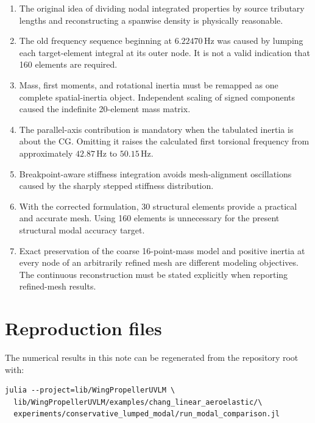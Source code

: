 \documentclass[11pt,a4paper]{article}
\newcommand{\Hz}{\,\mathrm{Hz}}
\begin{document}
\begin{enumerate}
  \item The original idea of dividing nodal integrated properties by source
        tributary lengths and reconstructing a spanwise density is physically
        reasonable.
  \item The old frequency sequence beginning at \(6.22470\Hz\) was caused by
        lumping each target-element integral at its outer node.  It is not a
        valid indication that 160 elements are required.
  \item Mass, first moments, and rotational inertia must be remapped as one
        complete spatial-inertia object.  Independent scaling of signed
        components caused the indefinite 20-element mass matrix.
  \item The parallel-axis contribution is mandatory when the tabulated
        inertia is about the CG.  Omitting it raises the calculated first
        torsional frequency from approximately \(42.87\Hz\) to
        \(50.15\Hz\).
  \item Breakpoint-aware stiffness integration avoids mesh-alignment
        oscillations caused by the sharply stepped stiffness distribution.
  \item With the corrected formulation, 30 structural elements provide a
        practical and accurate mesh.  Using 160 elements is unnecessary for
        the present structural modal accuracy target.
  \item Exact preservation of the coarse 16-point-mass model and positive
        inertia at every node of an arbitrarily refined mesh are different
        modeling objectives.  The continuous reconstruction must be stated
        explicitly when reporting refined-mesh results.
\end{enumerate}

\appendix

\section{Reproduction files}

The numerical results in this note can be regenerated from the repository
root with:

\begin{lstlisting}[language={},caption={PowerShell command for the modal audit.}]
julia --project=lib/WingPropellerUVLM \
  lib/WingPropellerUVLM/examples/chang_linear_aeroelastic/\
  experiments/conservative_lumped_modal/run_modal_comparison.jl
\end{lstlisting}
\end{document}
